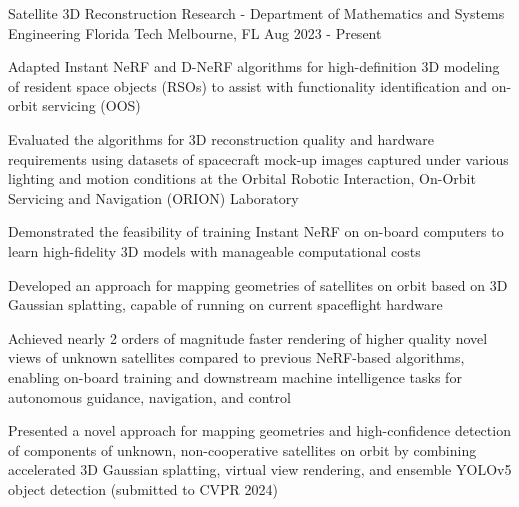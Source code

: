 
\begin{cventries}
    \cventry
    {Satellite 3D Reconstruction Research - Department of Mathematics and Systems Engineering}
    {Florida Tech}
    {Melbourne, FL}
    {Aug 2023 - Present}
    {\begin{cvitems}
            \item {Adapted Instant NeRF and D-NeRF algorithms for high-definition 3D modeling of resident space objects (RSOs) to assist with functionality identification and on-orbit servicing (OOS)}
            \item {Evaluated the algorithms for 3D reconstruction quality and hardware requirements using datasets of spacecraft mock-up images captured under various lighting and motion conditions at the Orbital Robotic Interaction, On-Orbit Servicing and Navigation (ORION) Laboratory}
            \item {Demonstrated the feasibility of training Instant NeRF on on-board computers to learn high-fidelity 3D models with manageable computational costs}
            \item {Developed an approach for mapping geometries of satellites on orbit based on 3D Gaussian splatting, capable of running on current spaceflight hardware}
            \item {Achieved nearly 2 orders of magnitude faster rendering of higher quality novel views of unknown satellites compared to previous NeRF-based algorithms, enabling on-board training and downstream machine intelligence tasks for autonomous guidance, navigation, and control}
            \item {Presented a novel approach for mapping geometries and high-confidence detection of components of unknown, non-cooperative satellites on orbit by combining accelerated 3D Gaussian splatting, virtual view rendering, and ensemble YOLOv5 object detection (submitted to CVPR 2024)}
        \end{cvitems}}


\end{cventries}
